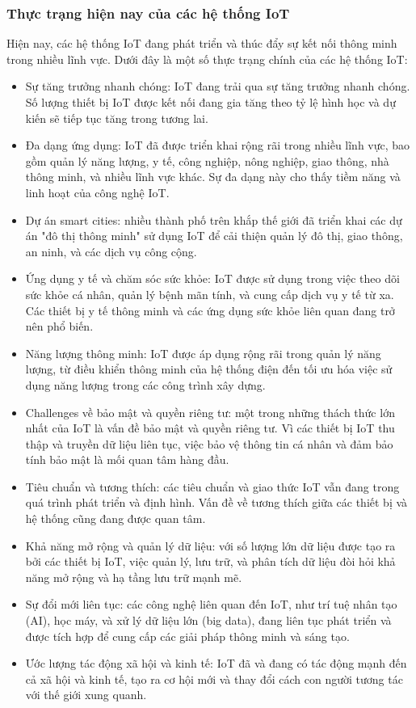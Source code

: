 \documentclass{article} %
\begin{document}
\subsubsection{Thực trạng hiện nay của các hệ thống IoT}

Hiện nay, các hệ thống IoT đang phát triển và thúc đẩy sự kết nối thông minh trong nhiều lĩnh vực. Dưới đây là một số thực trạng chính của các hệ thống IoT:

\begin{itemize}
\item Sự tăng trưởng nhanh chóng: IoT đang trải qua sự tăng trưởng nhanh chóng. Số lượng thiết bị IoT được kết nối đang gia tăng theo tỷ lệ hình học và dự kiến sẽ tiếp tục tăng trong tương lai.
\item Đa dạng ứng dụng: IoT đã được triển khai rộng rãi trong nhiều lĩnh vực, bao gồm quản lý năng lượng, y tế, công nghiệp, nông nghiệp, giao thông, nhà thông minh, và nhiều lĩnh vực khác. Sự đa dạng này cho thấy tiềm năng và linh hoạt của công nghệ IoT.
\item Dự án smart cities: nhiều thành phố trên khắp thế giới đã triển khai các dự án "đô thị thông minh" sử dụng IoT để cải thiện quản lý đô thị, giao thông, an ninh, và các dịch vụ công cộng.
\item Ứng dụng y tế và chăm sóc sức khỏe: IoT được sử dụng trong việc theo dõi sức khỏe cá nhân, quản lý bệnh mãn tính, và cung cấp dịch vụ y tế từ xa. Các thiết bị y tế thông minh và các ứng dụng sức khỏe liên quan đang trở nên phổ biến.
\item Năng lượng thông minh: IoT được áp dụng rộng rãi trong quản lý năng lượng, từ điều khiển thông minh của hệ thống điện đến tối ưu hóa việc sử dụng năng lượng trong các công trình xây dựng.
\item Challenges về bảo mật và quyền riêng tư: một trong những thách thức lớn nhất của IoT là vấn đề bảo mật và quyền riêng tư. Vì các thiết bị IoT thu thập và truyền dữ liệu liên tục, việc bảo vệ thông tin cá nhân và đảm bảo tính bảo mật là mối quan tâm hàng đầu.
\item Tiêu chuẩn và tương thích: các tiêu chuẩn và giao thức IoT vẫn đang trong quá trình phát triển và định hình. Vấn đề về tương thích giữa các thiết bị và hệ thống cũng đang được quan tâm.
\item Khả năng mở rộng và quản lý dữ liệu: với số lượng lớn dữ liệu được tạo ra bởi các thiết bị IoT, việc quản lý, lưu trữ, và phân tích dữ liệu đòi hỏi khả năng mở rộng và hạ tầng lưu trữ mạnh mẽ.
\item Sự đổi mới liên tục: các công nghệ liên quan đến IoT, như trí tuệ nhân tạo (AI), học máy, và xử lý dữ liệu lớn (big data), đang liên tục phát triển và được tích hợp để cung cấp các giải pháp thông minh và sáng tạo.
\item Ước lượng tác động xã hội và kinh tế: IoT đã và đang có tác động mạnh đến cả xã hội và kinh tế, tạo ra cơ hội mới và thay đổi cách con người tương tác với thế giới xung quanh.

\end{itemize}
\end{document}
